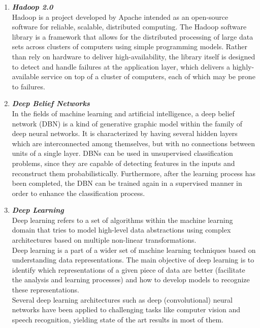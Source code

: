 \documentclass{article}
\begin{document}
\begin{enumerate}[label=(\alph*)]
\begin{enumerate}[label=\textbf{\arabic*.}]
            \item \textbf{\textit{Hadoop 2.0}}\\
Hadoop is a project developed by Apache intended as an open-source software for reliable, scalable, distributed computing. The Hadoop software library is a framework that allows for the distributed processing of large data sets across clusters of computers using simple programming models. Rather than rely on hardware to deliver high-availability, the library itself is designed to detect and handle failures at the application layer, which delivers a highly-available service on top of a cluster of computers, each of which may be prone to failures.
            
            \item \textbf{\textit{Deep Belief Networks}}\\
In the fields of machine learning and artificial intelligence, a deep belief network (DBN) is a kind of generative graphic model within the family of deep neural networks. It is characterized by having several hidden layers which are interconnected among themselves, but with no connections between units of a single layer. DBNs can be used in unsupervised classification problems, since they are capable of detecting features in the inputs and reconstruct them probabilistically. Furthermore, after the learning process has been completed, the DBN can be trained again in a supervised manner in order to enhance the classification process.
            
            \item \textbf{\textit{Deep Learning}}\\
Deep learning refers to a set of algorithms within the machine learning domain that tries to model high-level data abstractions using complex architectures based on multiple non-linear transformations.\\
Deep learning is a part of a wider set of machine learning techniques based on understanding data representations. The main objective of deep learning is to identify which representations of a given piece of data are better (facilitate the analysis and learning processes) and how to develop models to recognize these representations.\\
Several deep learning architectures such as deep (convolutional) neural networks have been applied to challenging tasks like computer vision and speech recognition, yielding state of the art results in most of them.
            

\end{enumerate}
\end{enumerate}
\end{document}
